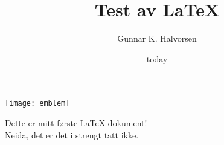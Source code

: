 \documentclass[12pt, letterpaper]{article}
\title{Test av \LaTeX{}}
\author{Gunnar K. Halvorsen}
\date{today}
\begin{document}
\maketitle

\centerline{\texttt{[image: emblem]}}

\clearpage



Dette er mitt første \LaTeX{}-dokument! \\
Neida, det er det i strengt tatt ikke.

\end{document}
